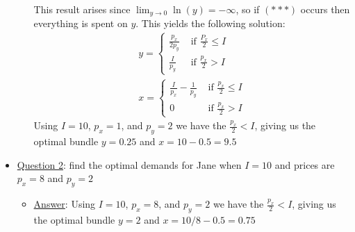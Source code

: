 \documentclass{article}
\begin{document}
\begin{itemize}
\begin{itemize}
\begin{gather*}
    \end{gather*}
    This result arises since $\lim_{y \rightarrow 0} \ln(y) = -\infty$, so if $(***)$ occurs then everything is spent on $y$. This yields the following solution:
    \begin{gather*}
      y =
      \begin{cases}
        \frac{p_{x}}{2p_{y}} & \text{ if } \frac{P_{x}}{2} \leq I \\
        \frac{I}{p_{y}} & \text{ if } \frac{p_{x}}{2} > I
       \end{cases}
      \\
      x =
      \begin{cases}
        \frac{I}{p_{x}} - \frac{1}{p_{y}} & \text{ if } \frac{p_{x}}{2} \leq I \\
        0 & \text{ if } \frac{p_{x}}{2} > I
       \end{cases}
    \end{gather*}
    Using $I = 10$, $p_{x} = 1$, and $p_{y} = 2$ we have the $\tfrac{p_{x}}{2} < I$, giving us the optimal bundle $y = 0.25$ and $x = 10 - 0.5 = 9.5$
  \end{itemize}
  \item  \underline{Question 2}: find the optimal demands for Jane when $I = 10$ and prices are $p_{x} = 8$ and $p_{y} = 2$
  \begin{itemize}
    \item  \underline{Answer}: Using $I = 10$, $p_{x} = 8$, and $p_{y} = 2$ we have the $\tfrac{p_{x}}{2} < I$, giving us the optimal bundle $y = 2$ and $x = 10/8 - 0.5 = 0.75$
  \end{itemize}
\end{itemize}
\par
\vspace{6mm}
\end{document}
